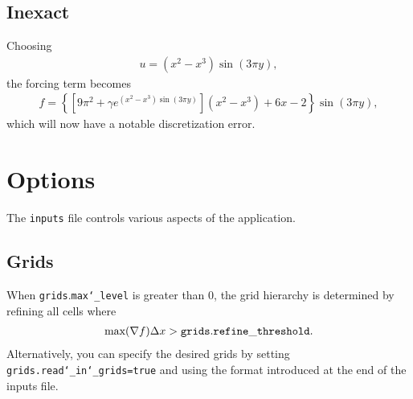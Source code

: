 \documentclass[10pt]{article}
\begin{document}
\subsection{Inexact}
\label{sec:inexact}
Choosing 
\begin{align}
u=(x^2-x^3) \sin (3 \pi y),
\end{align}
the forcing term becomes
\begin{align}
f = \left\{ \left[9 \pi^2 + \gamma e^{(x^2-x^3) \sin (3 \pi y)} \right] (x^2 - x^3) +6x -2 \right\} \sin (3 \pi y),
\end{align}
which will now have a notable discretization error.

\section{Options}
\label{sec:options}
The \texttt{inputs} file controls various aspects of the application.

\subsection{Grids}
When \texttt{grids}.\texttt{max\char`_level} is greater than $0$, the grid hierarchy is determined by refining all cells where
\begin{align}
\text{max}(\nabla f) \Delta x > \texttt{grids}.\texttt{refine}\char`_\texttt{threshold}.
\end{align}
Alternatively, you can specify the desired grids by setting \texttt{grids.read\char`_in\char`_grids=true} and using the format introduced at the end of the inputs file.
\end{document}

